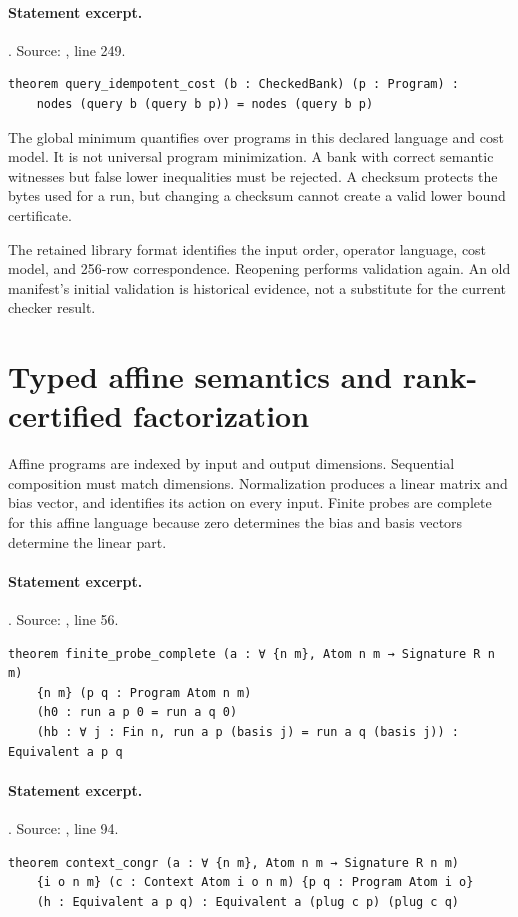 \documentclass[11pt]{article}
\begin{document}
\paragraph{Statement excerpt.}. Source: , line 249.
\begin{lstlisting}[style=AVOCSource]
theorem query_idempotent_cost (b : CheckedBank) (p : Program) :
    nodes (query b (query b p)) = nodes (query b p)
\end{lstlisting}


The global minimum quantifies over programs in this declared language and cost
model. It is not universal program minimization. A bank with correct semantic
witnesses but false lower inequalities must be rejected. A checksum protects
the bytes used for a run, but changing a checksum cannot create a valid lower
bound certificate.

The retained library format identifies the input order, operator language,
cost model, and 256-row correspondence. Reopening performs validation again.
An old manifest's initial validation is historical evidence, not a substitute
for the current checker result.

\section{Typed affine semantics and rank-certified factorization}
Affine programs are indexed by input and output dimensions. Sequential
composition must match dimensions. Normalization produces a linear matrix and
bias vector, and  identifies its action on every input.
Finite probes are complete for this affine language because zero determines
the bias and basis vectors determine the linear part.

\paragraph{Statement excerpt.}. Source: , line 56.
\begin{lstlisting}[style=AVOCSource]
theorem finite_probe_complete (a : ∀ {n m}, Atom n m → Signature R n m)
    {n m} (p q : Program Atom n m)
    (h0 : run a p 0 = run a q 0)
    (hb : ∀ j : Fin n, run a p (basis j) = run a q (basis j)) : Equivalent a p q
\end{lstlisting}

\paragraph{Statement excerpt.}. Source: , line 94.
\begin{lstlisting}[style=AVOCSource]
theorem context_congr (a : ∀ {n m}, Atom n m → Signature R n m)
    {i o n m} (c : Context Atom i o n m) {p q : Program Atom i o}
    (h : Equivalent a p q) : Equivalent a (plug c p) (plug c q)
\end{lstlisting}
\end{document}
